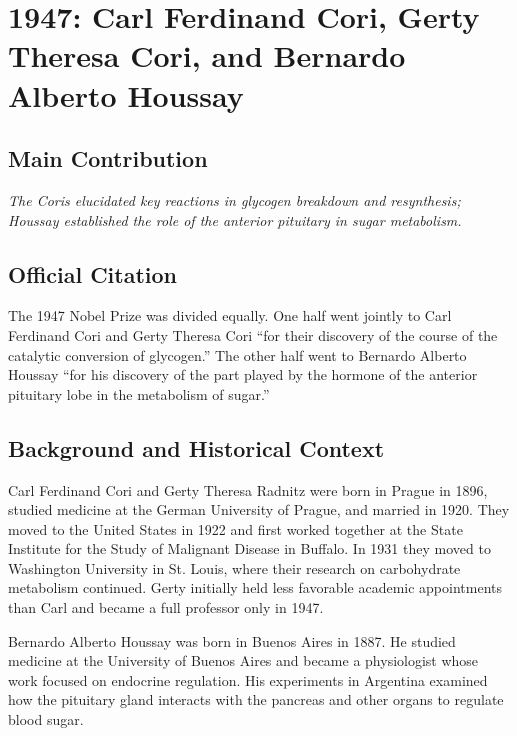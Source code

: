 \chapter[1947 --- Cori, Cori, and Houssay]{1947: Carl Ferdinand Cori, Gerty Theresa Cori, and Bernardo Alberto Houssay}
\label{ch:1947_Cori}

\section*{Main Contribution}

\textit{The Coris elucidated key reactions in glycogen breakdown and resynthesis; Houssay established the role of the anterior pituitary in sugar metabolism.}\cite{nobel-1947,lecture-1947}

\section{Official Citation}

The 1947 Nobel Prize was divided equally. One half went jointly to Carl Ferdinand Cori and Gerty Theresa Cori ``for their discovery of the course of the catalytic conversion of glycogen.'' The other half went to Bernardo Alberto Houssay ``for his discovery of the part played by the hormone of the anterior pituitary lobe in the metabolism of sugar.''

\section{Background and Historical Context}

Carl Ferdinand Cori and Gerty Theresa Radnitz were born in Prague in 1896, studied medicine at the German University of Prague, and married in 1920. They moved to the United States in 1922 and first worked together at the State Institute for the Study of Malignant Disease in Buffalo. In 1931 they moved to Washington University in St. Louis, where their research on carbohydrate metabolism continued. Gerty initially held less favorable academic appointments than Carl and became a full professor only in 1947.

Bernardo Alberto Houssay was born in Buenos Aires in 1887. He studied medicine at the University of Buenos Aires and became a physiologist whose work focused on endocrine regulation. His experiments in Argentina examined how the pituitary gland interacts with the pancreas and other organs to regulate blood sugar.

